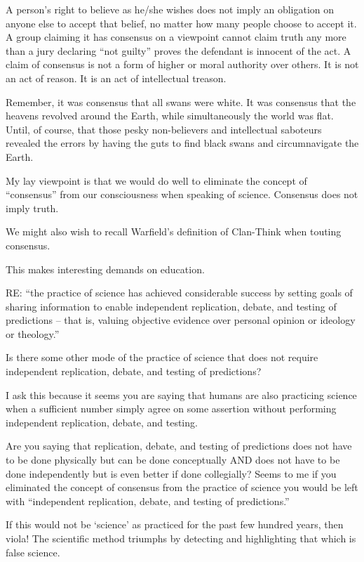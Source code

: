 A person’s right to believe as he/she wishes does not imply an obligation on anyone else to accept that belief, no matter how many people choose to accept it. A group claiming it has consensus on a viewpoint cannot claim truth any more than a jury declaring “not guilty” proves the defendant is innocent of the act. A claim of consensus is not a form of higher or moral authority over others. It is not an act of reason. It is an act of intellectual treason.

Remember, it was consensus that all swans were white. It was consensus that the heavens revolved around the Earth, while simultaneously the world was flat. Until, of course, that those pesky non-believers and intellectual saboteurs revealed the errors by having the guts to find black swans and circumnavigate the Earth.

My lay viewpoint is that we would do well to eliminate the concept of “consensus” from our consciousness when speaking of science. Consensus does not imply truth.

We might also wish to recall Warfield’s definition of Clan-Think when touting consensus.

This makes interesting demands on education.

RE: “the practice of science has achieved considerable success by setting goals of sharing information to enable independent replication, debate, and testing of predictions – that is, valuing objective evidence over personal opinion or ideology or theology.”

Is there some other mode of the practice of science  that does not require independent replication, debate, and testing of predictions?

I ask this because it seems you are saying that humans are also practicing science when a sufficient number simply agree on some assertion without performing independent replication, debate, and testing.

Are you saying that replication, debate, and testing of predictions does not have to be done physically but can be done conceptually AND does not have to be done independently but is even better if done collegially?
Seems to me if you eliminated the concept of consensus from the practice of science you would be left with “independent replication, debate, and testing of predictions.”

If this would not be ‘science’ as practiced for the past few hundred years, then viola! The scientific method triumphs by detecting and highlighting that which is false science.


